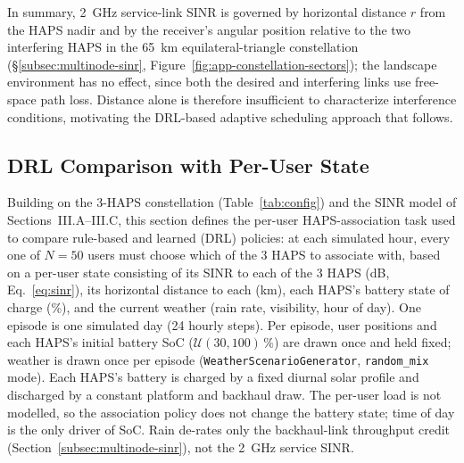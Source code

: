 \documentclass[conference]{IEEEtran}
\begin{document}
In summary, 2~GHz service-link SINR is governed by horizontal distance $r$ from the HAPS nadir and by the receiver's angular position relative to the two interfering HAPS in the 65~km equilateral-triangle constellation (\S\ref{subsec:multinode-sinr}, Figure~\ref{fig:app-constellation-sectors}); the landscape environment has no effect, since both the desired and interfering links use free-space path loss. Distance alone is therefore insufficient to characterize interference conditions, motivating the DRL-based adaptive scheduling approach that follows.

\subsection{DRL Comparison with Per-User State}
\label{sec:assoc-baseline-setup}

Building on the 3-HAPS constellation (Table~\ref{tab:config}) and the SINR model of
Sections~III.A--III.C, this section defines the per-user HAPS-association task used
to compare rule-based and learned (DRL) policies: at each simulated hour, every one
of $N=50$ users must choose which of the 3 HAPS to associate with, based on a
per-user state consisting of its SINR to each of the 3 HAPS
(dB, Eq.~\eqref{eq:sinr}), its horizontal distance to each (km), each HAPS's battery
state of charge (\%), and the current weather (rain rate, visibility, hour of day).
One episode is one simulated day (24 hourly steps). Per episode, user positions and
each HAPS's initial battery SoC ($\mathcal{U}(30,100)\,\%$) are drawn once and held
fixed; weather is drawn once per episode (\texttt{WeatherScenarioGenerator},
\texttt{random\_mix} mode). Each HAPS's battery is charged by a fixed diurnal solar
profile and discharged by a constant platform and backhaul draw. The per-user load is not modelled, so the association
policy does not change the battery state; time of day is the only driver of SoC. Rain de-rates only the
backhaul-link throughput credit (Section~\ref{subsec:multinode-sinr}), not the 2~GHz
service SINR.
\end{document}
